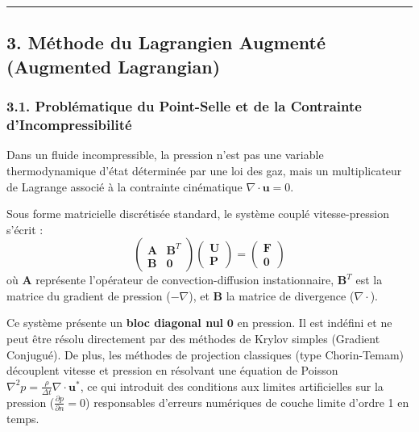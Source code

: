 \documentclass[
  french,
]{article}
\begin{document}
\begin{center}\rule{0.5\linewidth}{0.5pt}\end{center}

\subsection{3. Méthode du Lagrangien Augmenté (Augmented
Lagrangian)}\label{muxe9thode-du-lagrangien-augmentuxe9-augmented-lagrangian}

\subsubsection{3.1. Problématique du Point-Selle et de la Contrainte
d'Incompressibilité}\label{probluxe9matique-du-point-selle-et-de-la-contrainte-dincompressibilituxe9}

Dans un fluide incompressible, la pression n'est pas une variable
thermodynamique d'état déterminée par une loi des gaz, mais un
multiplicateur de Lagrange associé à la contrainte cinématique
\(\nabla \cdot \mathbf{u} = 0\).

Sous forme matricielle discrétisée standard, le système couplé
vitesse-pression s'écrit :
\[\begin{pmatrix} \mathbf{A} & \mathbf{B}^T \\ \mathbf{B} & \mathbf{0} \end{pmatrix} \begin{pmatrix} \mathbf{U} \\ \mathbf{P} \end{pmatrix} = \begin{pmatrix} \mathbf{F} \\ \mathbf{0} \end{pmatrix}\]
où \(\mathbf{A}\) représente l'opérateur de convection-diffusion
instationnaire, \(\mathbf{B}^T\) est la matrice du gradient de pression
(\(-\nabla\)), et \(\mathbf{B}\) la matrice de divergence
(\(\nabla \cdot\)).

Ce système présente un \textbf{bloc diagonal nul} \(\mathbf{0}\) en
pression. Il est indéfini et ne peut être résolu directement par des
méthodes de Krylov simples (Gradient Conjugué). De plus, les méthodes de
projection classiques (type Chorin-Temam) découplent vitesse et pression
en résolvant une équation de Poisson
\(\nabla^2 p = \frac{\rho}{\Delta t} \nabla \cdot \mathbf{u}^*\), ce qui
introduit des conditions aux limites artificielles sur la pression
(\(\frac{\partial p}{\partial n} = 0\)) responsables d'erreurs
numériques de couche limite d'ordre 1 en temps.
\end{document}
